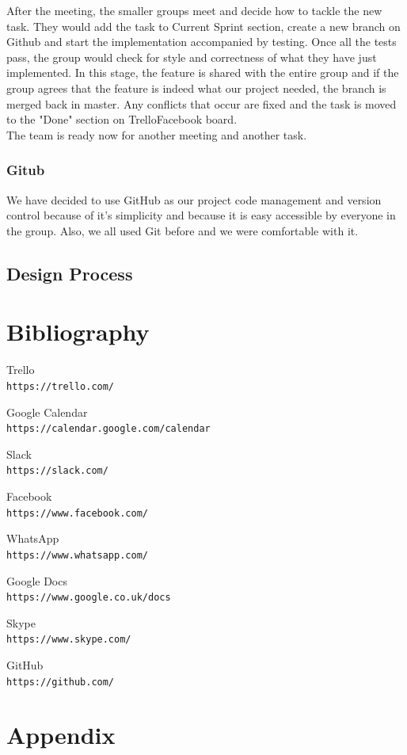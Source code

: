 \documentclass{article}
\begin{document}
	After the meeting, the smaller groups meet and decide how to tackle the new task. They would add the task to Current Sprint section, create a new branch on Github and start the implementation accompanied by testing. Once all the tests pass, the group would check for style and correctness of what they have just implemented. In this stage, the feature is shared with the entire group and if the group agrees that the feature is indeed what our project needed, the branch is merged back in master. Any conflicts that occur are fixed and the task is moved to the "Done" section on TrelloFacebook board. \\
	
The team is ready now for another meeting and another task.    

\subsubsection{Gitub \cite{github} }
We have decided to use GitHub as our project code management and version control because of it’s simplicity and because it is easy accessible by everyone in the group. Also, we all used Git before and we were comfortable with it. 


\subsection{Design Process}
	
	
	
	


\newpage

\section{Bibliography}  
\begin{thebibliography}{9}
Trello 
\\\texttt{https://trello.com/}

Google Calendar
\\\texttt{https://calendar.google.com/calendar}

Slack 
\\\texttt{https://slack.com/}


Facebook
\\\texttt{https://www.facebook.com/}

WhatsApp
\\\texttt{https://www.whatsapp.com/}

Google Docs
\\\texttt{https://www.google.co.uk/docs}


Skype
\\\texttt{https://www.skype.com/}



GitHub 
\\\texttt{https://github.com/}
\end{thebibliography}


\newpage

\appendix
\section{Appendix }
\end{document}
